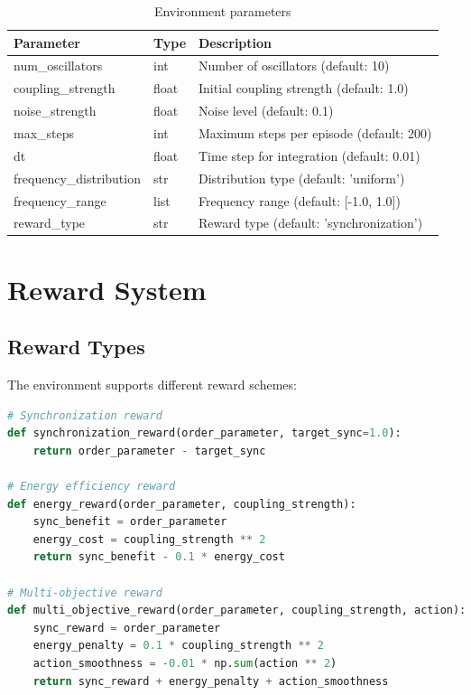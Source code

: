 \begin{table}[H]
\centering
\begin{tabular}{|l|l|l|}
\hline
\textbf{Parameter} & \textbf{Type} & \textbf{Description} \\
\hline
num\_oscillators & int & Number of oscillators (default: 10) \\
coupling\_strength & float & Initial coupling strength (default: 1.0) \\
noise\_strength & float & Noise level (default: 0.1) \\
max\_steps & int & Maximum steps per episode (default: 200) \\
dt & float & Time step for integration (default: 0.01) \\
frequency\_distribution & str & Distribution type (default: 'uniform') \\
frequency\_range & list & Frequency range (default: [-1.0, 1.0]) \\
reward\_type & str & Reward type (default: 'synchronization') \\
\hline
\end{tabular}
\caption{Environment parameters}
\end{table}

\section{Reward System}

\subsection{Reward Types}

The environment supports different reward schemes:

\begin{lstlisting}[language=python, caption=Reward Types]
# Synchronization reward
def synchronization_reward(order_parameter, target_sync=1.0):
    return order_parameter - target_sync

# Energy efficiency reward
def energy_reward(order_parameter, coupling_strength):
    sync_benefit = order_parameter
    energy_cost = coupling_strength ** 2
    return sync_benefit - 0.1 * energy_cost

# Multi-objective reward
def multi_objective_reward(order_parameter, coupling_strength, action):
    sync_reward = order_parameter
    energy_penalty = 0.1 * coupling_strength ** 2
    action_smoothness = -0.01 * np.sum(action ** 2)
    return sync_reward + energy_penalty + action_smoothness
\end{lstlisting}


